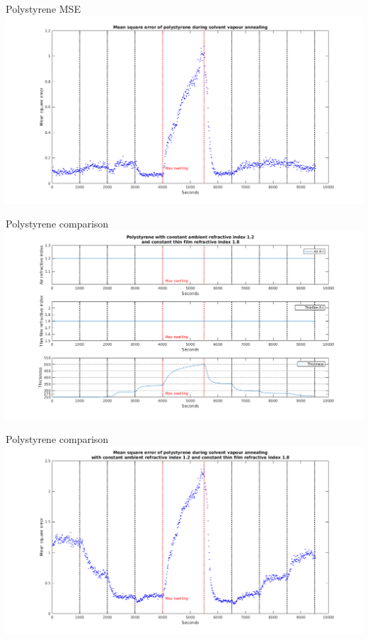 \documentclass[10pt]{beamer}
\begin{document}
\begin{frame}{Polystyrene MSE}
\includegraphics[width=\textwidth]{PSswelling2.png}
\end{frame}


\begin{frame}{Polystyrene comparison}
	\centering
	\includegraphics[width=\textwidth]{PSn12n18AVG1.png}
\end{frame}

\begin{frame}{Polystyrene comparison}
	\centering
	\includegraphics[width=\textwidth]{PSn12n18AVG2.png}\
\end{frame}
\end{document}
